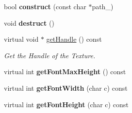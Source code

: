 \begin{DoxyCompactItemize}
\item 
bool {\bfseries construct} (const char $\ast$path\+\_\+)\hypertarget{class_magnum_1_1_font_aa2a03876af821be9d3cb7fa6f5018aff}{}\label{class_magnum_1_1_font_aa2a03876af821be9d3cb7fa6f5018aff}

\item 
void {\bfseries destruct} ()\hypertarget{class_magnum_1_1_font_a617d7ce6f55319769b70bfae047762b5}{}\label{class_magnum_1_1_font_a617d7ce6f55319769b70bfae047762b5}

\item 
virtual void $\ast$ \hyperlink{class_magnum_1_1_font_ae39eee8daf71d9379bb7d7fccb502442}{get\+Handle} () const 
\begin{DoxyCompactList}\small\item\em Get the Handle of the Texture. \end{DoxyCompactList}\item 
virtual int {\bfseries get\+Font\+Max\+Height} () const \hypertarget{class_magnum_1_1_font_a87d0a3c75b86a504de5d07c24cdf068d}{}\label{class_magnum_1_1_font_a87d0a3c75b86a504de5d07c24cdf068d}

\item 
virtual int {\bfseries get\+Font\+Width} (char c) const \hypertarget{class_magnum_1_1_font_a13295e1ba54f3af7869639bbb81d6441}{}\label{class_magnum_1_1_font_a13295e1ba54f3af7869639bbb81d6441}

\item 
virtual int {\bfseries get\+Font\+Height} (char c) const \hypertarget{class_magnum_1_1_font_add65acda319db553876a61e7958571c0}{}\label{class_magnum_1_1_font_add65acda319db553876a61e7958571c0}


\end{DoxyCompactItemize}
